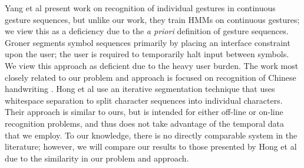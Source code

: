 \documentclass[twoside]{article}
\begin{document}
\begin{multicols}{2}
Yang et al \cite{yang_gesture_1994} present work on recognition of individual
gestures in continuous gesture sequences, but unlike our work, they train HMMs
on continuous gestures; we view this as a deficiency due to the \emph{a priori}
definition of gesture sequences. Groner \cite{groner_real-time_1966} segments
symbol sequences primarily by placing an interface constraint upon the user; the
user is required to temporarily halt input between symbols. We view this
approach as deficient due to the heavy user burden. The work most closely
related to our problem and approach is focused on recognition of Chinese
handwriting \cite{hong1998segmentation}. Hong et al use an iterative
segmentation technique that uses whitespace separation to split character
sequences into individual characters. Their approach is similar to ours, but is
intended for either off-line or on-line recognition problems, and thus does not
take advantage of the temporal data that we employ. To our knowledge, there is
no directly comparable system in the literature; however, we will compare our
results to those presented by Hong et al\cite{hong1998segmentation} due to the
similarity in our problem and approach.






\end{multicols}
\end{document}
